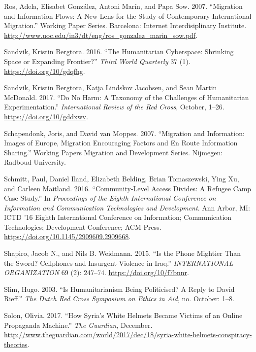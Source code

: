 \documentclass[
]{article}
\newlength{\cslhangindent}
\newenvironment{cslreferences}%
  {\setlength{\parindent}{0pt}%
  \everypar{\setlength{\hangindent}{\cslhangindent}}\ignorespaces}%
  {\par}
\begin{document}
\begin{cslreferences}
\leavevmode\hypertarget{ref-Ros2007Migration}{}%
Ros, Adela, Elisabet González, Antoni Marín, and Papa Sow. 2007.
``Migration and Information Flows: A New Lens for the Study of
Contemporary International Migration.'' Working Paper Series. Barcelona:
Internet Interdisiplinary Institute.
\url{http://www.uoc.edu/in3/dt/eng/ros_gonzalez_marin_sow.pdf}.

\leavevmode\hypertarget{ref-Sandvik2016Humanitarian}{}%
Sandvik, Kristin Bergtora. 2016. ``The Humanitarian Cyberspace:
Shrinking Space or Expanding Frontier?'' \emph{Third World Quarterly} 37
(1). \url{https://doi.org/10/gdqfhg}.

\leavevmode\hypertarget{ref-Sandvik2017Do}{}%
Sandvik, Kristin Bergtora, Katja Lindskov Jacobsen, and Sean Martin
McDonald. 2017. ``Do No Harm: A Taxonomy of the Challenges of
Humanitarian Experimentation.'' \emph{International Review of the Red
Cross}, October, 1--26. \url{https://doi.org/10/gddxwv}.

\leavevmode\hypertarget{ref-Schapendonk2007Migration}{}%
Schapendonk, Joris, and David van Moppes. 2007. ``Migration and
Information: Images of Europe, Migration Encouraging Factors and En
Route Information Sharing.'' Working Papers Migration and Development
Series. Nijmegen: Radboud University.

\leavevmode\hypertarget{ref-Schmitt2016Community-Level}{}%
Schmitt, Paul, Daniel Iland, Elizabeth Belding, Brian Tomaszewski, Ying
Xu, and Carleen Maitland. 2016. ``Community-Level Access Divides: A
Refugee Camp Case Study.'' In \emph{Proceedings of the Eighth
International Conference on Information and Communication Technologies
and Development}. Ann Arbor, MI: ICTD '16 Eighth International
Conference on Information; Communication Technologies; Development
Conference; ACM Press. \url{https://doi.org/10.1145/2909609.2909668}.

\leavevmode\hypertarget{ref-Shapiro2015Is}{}%
Shapiro, Jacob N., and Nils B. Weidmann. 2015. ``Is the Phone Mightier
Than the Sword? Cellphones and Insurgent Violence in Iraq.''
\emph{INTERNATIONAL ORGANIZATION} 69 (2): 247--74.
\url{https://doi.org/10/f7bnnr}.

\leavevmode\hypertarget{ref-Slim2003Is}{}%
Slim, Hugo. 2003. ``Is Humanitarianism Being Politicised? A Reply to
David Rieff.'' \emph{The Dutch Red Cross Symposium on Ethics in Aid},
no. October: 1--8.

\leavevmode\hypertarget{ref-Solon2017How}{}%
Solon, Olivia. 2017. ``How Syria's White Helmets Became Victims of an
Online Propaganda Machine.'' \emph{The Guardian}, December.
\url{http://www.theguardian.com/world/2017/dec/18/syria-white-helmets-conspiracy-theories}.


\end{cslreferences}
\end{document}
